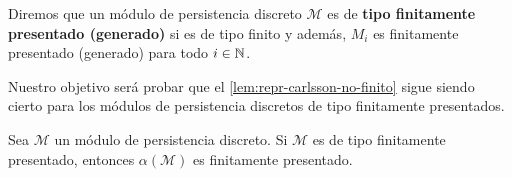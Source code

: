 \begin{definicion}
	Diremos que un módulo de persistencia discreto $\mathcal{M}$ es de \textbf{tipo
		finitamente presentado (generado)} si es de tipo finito y además, $M_{i}$ es finitamente
	presentado (generado) para todo $i \in \mathbb{N}$.
\end{definicion}

Nuestro objetivo será probar que el \autoref{lem:repr-carlsson-no-finito} sigue siendo
cierto para los módulos de persistencia discretos de tipo finitamente presentados.

\begin{lema}
	\label{lem:alpha-finito-presentado} Sea $\mathcal{M}$ un módulo de persistencia
	discreto. Si $\mathcal{M}$ es de tipo finitamente presentado, entonces $\alpha(
	\mathcal{M})$ es finitamente presentado.
\end{lema}
